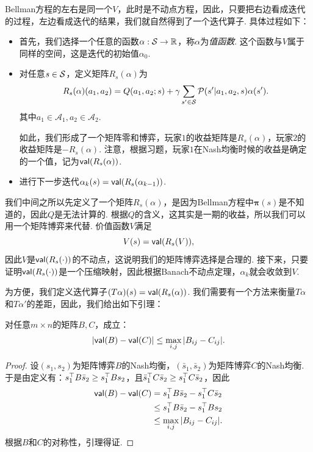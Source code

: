 Bellman方程的左右是同一个$V$，此时是不动点方程，因此，只要把右边看成迭代的过程，左边看成迭代的结果，我们就自然得到了一个迭代算子. 具体过程如下：
\begin{itemize}
    \item 首先，我们选择一个任意的函数$\alpha: \mathcal S\to \mathbb{R}$，称$\alpha$为\textit{值函数}. 这个函数与$V$属于同样的空间，这是迭代的初始值$\alpha_0$.
    \item 对任意$s\in \mathcal S$，定义矩阵$R_s(\alpha)$为
    \[R_s(\alpha)(a_1,a_2) = Q(a_1,a_2;s) + \gamma \sum_{s'\in \mathcal S}\mathcal P(s'|a_1,a_2,s)\alpha(s').\]
    其中$a_1\in \mathcal A_1, a_2\in \mathcal A_2$.
    
    如此，我们形成了一个矩阵零和博弈，玩家$1$的收益矩阵是$R_s(\alpha)$，玩家$2$的收益矩阵是$-R_s(\alpha)$. 注意，根据习题，玩家$1$在Nash均衡时候的收益是确定的一个值，记为$\mathsf{val}(R_s(\alpha))$.
    \item 进行下一步迭代$\alpha_k(s)=\mathsf{val}(R_s(\alpha_{k-1}))$. 
\end{itemize}

我们中间之所以先定义了一个矩阵$R_s(\alpha)$，是因为Bellman方程中$\boldsymbol{\pi}(s)$是不知道的，因此$Q$是无法计算的. 根据$Q$的含义，这其实是一期的收益，所以我们可以用一个矩阵博弈来代替. 价值函数$V$满足
\[V(s)=\mathsf{val}(R_s(V)),\]
因此$V$是$\mathsf{val}(R_s(\cdot))$的不动点，这说明我们的矩阵博弈选择是合理的. 接下来，只要证明$\mathsf{val}(R_s(\cdot))$是一个压缩映射，因此根据Banach不动点定理，$\alpha_k$就会收敛到$V$.

为方便，我们定义迭代算子$(T\alpha)(s) = \mathsf{val}(R_s(\alpha))$. 我们需要有一个方法来衡量$T\alpha$和$T\alpha'$的差距，因此，我们给出如下引理：

\begin{lemma}\label{lemma:matrix-game}
对任意$m\times n$的矩阵$B,C$，成立：
\[|\mathsf{val}(B)-\mathsf{val}(C)| \leq \max_{i,j}|B_{ij} - C_{ij}|.\]
\end{lemma}

\begin{proof}
设$(s_1,s_2)$为矩阵博弈$B$的Nash均衡，$(\bar{s}_1,\bar{s}_2)$为矩阵博弈$C$的Nash均衡. 于是由定义有：$s_1^\top B\bar{s}_2  \ge s_1^\top  B s_2$，且$\bar{s}_1 ^\top  C\bar{s}_2 \ge s_1^\top  C \bar{s}_2 $，因此
\begin{align*}
    \mathsf{val}(B)-\mathsf{val}(C) &= s_1^\top B\bar{s}_2 - s_1^\top  C\bar{s}_2 \\
    &\leq s_1^\top  B\bar{s}_2  - s_1^\top  B s_2 \\
    &\leq \max_{i,j}|B_{ij} - C_{ij}|.
\end{align*}
根据$B$和$C$的对称性，引理得证.
\end{proof}

